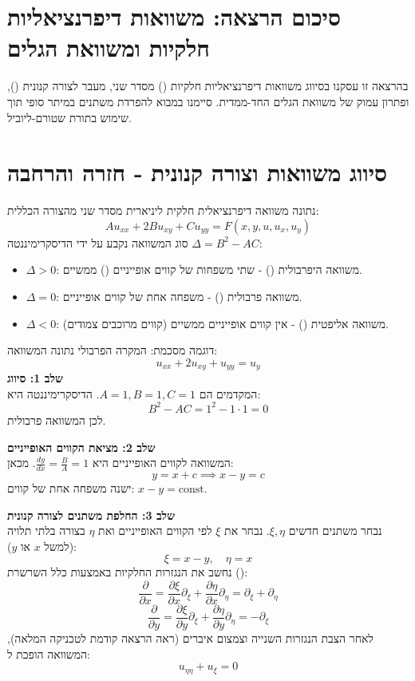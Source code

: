 \section*{סיכום הרצאה: משוואות דיפרנציאליות חלקיות ומשוואת הגלים}

בהרצאה זו עסקנו בסיווג משוואות דיפרנציאליות חלקיות () מסדר שני, מעבר לצורה קנונית (), ופתרון עמוק של משוואת הגלים החד-ממדית. סיימנו במבוא להפרדת משתנים במיתר סופי תוך שימוש בתורת שטורם-ליוביל.

\section{סיווג משוואות וצורה קנונית - חזרה והרחבה}

נתונה משוואה דיפרנציאלית חלקית ליניארית מסדר שני מהצורה הכללית:
$$ A u_{xx} + 2B u_{xy} + C u_{yy} = F(x, y, u, u_x, u_y) $$
סוג המשוואה נקבע על ידי הדיסקרימיננטה $\Delta = B^2 - AC$:
\begin{itemize}
    \item $\Delta > 0$: משוואה היפרבולית () - שתי משפחות של קווים אופייניים () ממשיים.
    \item $\Delta = 0$: משוואה פרבולית () - משפחה אחת של קווים אופייניים.
    \item $\Delta < 0$: משוואה אליפטית () - אין קווים אופייניים ממשיים (קווים מרוכבים צמודים).
\end{itemize}

\begin{examplebox}{דוגמה מסכמת: המקרה הפרבולי}
נתונה המשוואה:
$$ u_{xx} + 2u_{xy} + u_{yy} = u_y $$
\textbf{שלב 1: סיווג} \\
המקדמים הם $A=1, B=1, C=1$. הדיסקרימיננטה היא:
$$ B^2 - AC = 1^2 - 1\cdot 1 = 0 $$
לכן המשוואה פרבולית.

\textbf{שלב 2: מציאת הקווים האופייניים} \\
המשוואה לקווים האופייניים היא $\frac{dy}{dx} = \frac{B}{A} = 1$. מכאן:
$$ y = x + c \implies x - y = c $$
ישנה משפחה אחת של קווים: $x-y = \text{const}$.

\textbf{שלב 3: החלפת משתנים לצורה קנונית} \\
נבחר משתנים חדשים $\xi, \eta$. נבחר את $\xi$ לפי הקווים האופייניים ואת $\eta$ בצורה בלתי תלויה (למשל $x$ או $y$):
$$ \xi = x - y, \quad \eta = x $$
נחשב את הנגזרות החלקיות באמצעות כלל השרשרת ():
$$ \frac{\partial}{\partial x} = \frac{\partial \xi}{\partial x}\partial_\xi + \frac{\partial \eta}{\partial x}\partial_\eta = \partial_\xi + \partial_\eta $$
$$ \frac{\partial}{\partial y} = \frac{\partial \xi}{\partial y}\partial_\xi + \frac{\partial \eta}{\partial y}\partial_\eta = -\partial_\xi $$
לאחר הצבת הנגזרות השנייה וצמצום איברים (ראה הרצאה קודמת לטכניקה המלאה), המשוואה הופכת ל:
$$ u_{\eta\eta} + u_\xi = 0 $$
\end{examplebox}

